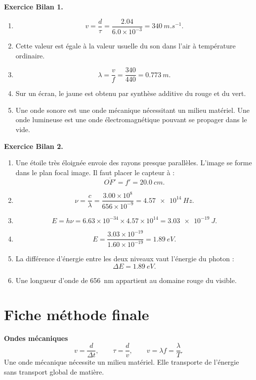\documentclass[11pt,a4paper]{article}
\newcommand{\corr}[2]{
  \begin{correctionbox}
  \textbf{Exercice #1.} #2
  \end{correctionbox}
}
\begin{document}
\corr{Bilan 1}{
\begin{enumerate}
  \item
  \[
  v=\frac{d}{\tau}=\frac{2.04}{6.0\times 10^{-3}}=\SI{340}{m.s^{-1}}.
  \]
  \item Cette valeur est égale à la valeur usuelle du son dans l'air à température ordinaire.
  \item
  \[
  \lambda=\frac{v}{f}=\frac{340}{440}=\SI{0.773}{m}.
  \]
  \item Sur un écran, le jaune est obtenu par synthèse additive du rouge et du vert.
  \item Une onde sonore est une onde mécanique nécessitant un milieu matériel. Une onde lumineuse est une onde électromagnétique pouvant se propager dans le vide.
\end{enumerate}
}

\corr{Bilan 2}{
\begin{enumerate}
  \item Une étoile très éloignée envoie des rayons presque parallèles. L'image se forme dans le plan focal image. Il faut placer le capteur à :
  \[
  \overline{OF'}=f'=\SI{20.0}{cm}.
  \]
  \item
  \[
  \nu=\frac{c}{\lambda}
  =\frac{3.00\times 10^8}{656\times 10^{-9}}
  =\SI{4.57e14}{Hz}.
  \]
  \item
  \[
  E=h\nu=6.63\times 10^{-34}\times 4.57\times 10^{14}
  =\SI{3.03e-19}{J}.
  \]
  \item
  \[
  E=\frac{3.03\times 10^{-19}}{1.60\times 10^{-19}}
  =\SI{1.89}{eV}.
  \]
  \item La différence d'énergie entre les deux niveaux vaut l'énergie du photon :
  \[
  \Delta E=\SI{1.89}{eV}.
  \]
  \item Une longueur d'onde de \SI{656}{nm} appartient au domaine rouge du visible.
\end{enumerate}
}

\newpage

\section{Fiche méthode finale}

\begin{retenirbox}
\textbf{Ondes mécaniques}
\[
v=\frac{d}{\Delta t},
\qquad
\tau=\frac{d}{v},
\qquad
v=\lambda f=\frac{\lambda}{T}.
\]
Une onde mécanique nécessite un milieu matériel. Elle transporte de l'énergie sans transport global de matière.
\end{retenirbox}
\end{document}
